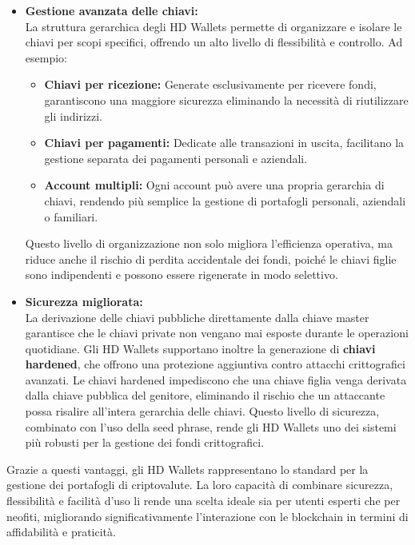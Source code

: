 \documentclass{article}
\begin{document}
\begin{itemize}
    \item \textbf{Gestione avanzata delle chiavi:} \\
    La struttura gerarchica degli HD Wallets permette di organizzare e isolare le chiavi per scopi specifici, offrendo un alto livello di flessibilità e controllo. Ad esempio:
    \begin{itemize}
        \item \textbf{Chiavi per ricezione:} Generate esclusivamente per ricevere fondi, garantiscono una maggiore sicurezza eliminando la necessità di riutilizzare gli indirizzi.\vspace{-0.5em}
        \item \textbf{Chiavi per pagamenti:} Dedicate alle transazioni in uscita, facilitano la gestione separata dei pagamenti personali e aziendali.\vspace{-0.5em}
        \item \textbf{Account multipli:} Ogni account può avere una propria gerarchia di chiavi, rendendo più semplice la gestione di portafogli personali, aziendali o familiari.\vspace{-0.5em}
    \end{itemize}
    Questo livello di organizzazione non solo migliora l'efficienza operativa, ma riduce anche il rischio di perdita accidentale dei fondi, poiché le chiavi figlie sono indipendenti e possono essere rigenerate in modo selettivo.\vspace{0.5em}

    \item \textbf{Sicurezza migliorata:} \\
    La derivazione delle chiavi pubbliche direttamente dalla chiave master garantisce che le chiavi private non vengano mai esposte durante le operazioni quotidiane. Gli HD Wallets supportano inoltre la generazione di \textbf{chiavi hardened}, che offrono una protezione aggiuntiva contro attacchi crittografici avanzati. Le chiavi hardened impediscono che una chiave figlia venga derivata dalla chiave pubblica del genitore, eliminando il rischio che un attaccante possa risalire all'intera gerarchia delle chiavi. Questo livello di sicurezza, combinato con l'uso della seed phrase, rende gli HD Wallets uno dei sistemi più robusti per la gestione dei fondi crittografici.\vspace{0.5em}
\end{itemize}

Grazie a questi vantaggi, gli HD Wallets rappresentano lo standard per la gestione dei portafogli di criptovalute. La loro capacità di combinare sicurezza, flessibilità e facilità d'uso li rende una scelta ideale sia per utenti esperti che per neofiti, migliorando significativamente l'interazione con le blockchain in termini di affidabilità e praticità.
\end{document}
